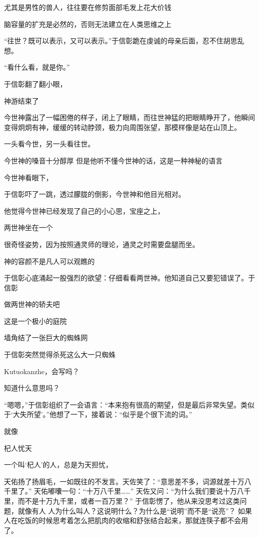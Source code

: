 尤其是男性的兽人，往往要在修剪面部毛发上花大价钱

脑容量的扩充是必然的，否则无法建立在人类思维之上




“往世？既可以表示，又可以表示。”于信彰跪在虔诚的母亲后面，忍不住胡思乱想。





“看什么看，就是你。”

于信彰翻了翻小眼，

神游结束了

今世神露出了一幅困倦的样子，闭上了眼睛，而往世神猛的把眼睛睁开了，他瞬间变得炯炯有神，缓缓的转动脖颈，极力向周围张望，那模样像是站在山顶上。


一头看今世，另一头看往世。

今世神的嗓音十分醇厚
但是他听不懂今世神的话，这是一种神秘的语言




今世神看眼下，

于信彰吓了一跳，透过朦胧的倒影，今世神和他目光相对。

他觉得今世神已经发现了自己的小心思，宝座之上，

两世神坐在一个

很奇怪姿势，因为按照通灵师的理论，通灵之时需要盘腿而坐。

神的容颜不是凡人可以观瞧的

于信彰心底涌起一股强烈的欲望：仔细看看两世神。他知道自己又要犯错误了。于信彰

做两世神的轿夫吧

这是一个极小的庭院

墙角结了一张巨大的蜘蛛网



于信彰突然觉得杀死这么大一只蜘蛛


Kutuokanzhe，会写吗？

知道什么意思吗？

“嗯嗯，”于信彰组织了一会语言：“本来抱有很高的期望，但是最后非常失望。类似于‘大失所望’。”他想了一下，接着说：“似乎是个很下流的词。”


就像

杞人忧天

一个叫‘杞人’的人，总是为天担忧，

天佑扬了扬眉毛，一如既往的不发言。天佐笑了：“意思差不多，词源就差十万八千里了。”
天佑嘟囔一句：“十万八千里……”
天佐又问：“为什么我们要说十万八千里，而不是十万九千里，或者一百万里？”
于信彰愣了，他从来没思考过这类问题，就像有人
人为什么叫人？这说明什么？为什么是“说明”而不是“说亮”？
如果人在吃饭的时候思考着怎么把肌肉的收缩和舒张结合起来，那就连筷子都不会用了。

